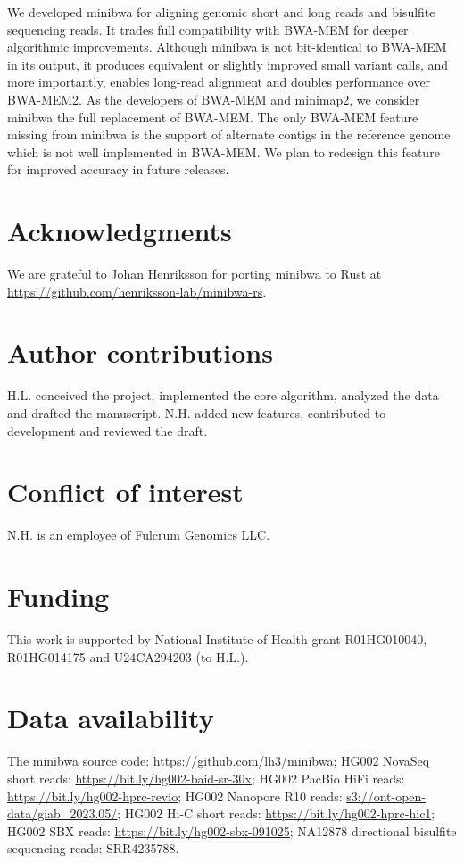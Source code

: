 \documentclass[webpdf,contemporary,large,namedate]{oup-authoring-template}%
\begin{document}
We developed minibwa for aligning genomic short and long reads and bisulfite sequencing reads.
It trades full compatibility with BWA-MEM for deeper algorithmic improvements.
Although minibwa is not bit-identical to BWA-MEM in its output,
it produces equivalent or slightly improved small variant calls,
and more importantly, enables long-read alignment and doubles performance over BWA-MEM2.
As the developers of BWA-MEM and minimap2, we consider minibwa the full replacement of BWA-MEM.
The only BWA-MEM feature missing from minibwa is the support of alternate contigs in the reference genome
which is not well implemented in BWA-MEM.
We plan to redesign this feature for improved accuracy in future releases.

\section*{Acknowledgments}

We are grateful to Johan Henriksson for porting minibwa to Rust at \url{https://github.com/henriksson-lab/minibwa-rs}.

\section*{Author contributions}

H.L. conceived the project, implemented the core algorithm, analyzed the data and drafted the manuscript.
N.H. added new features, contributed to development and reviewed the draft.

\section*{Conflict of interest}

N.H. is an employee of Fulcrum Genomics LLC.

\section*{Funding}

This work is supported by National Institute of Health grant R01HG010040, R01HG014175 and U24CA294203 (to H.L.).

\section*{Data availability}

The minibwa source code: \url{https://github.com/lh3/minibwa};
HG002 NovaSeq short reads: \url{https://bit.ly/hg002-baid-sr-30x};
HG002 PacBio HiFi reads: \url{https://bit.ly/hg002-hprc-revio};
HG002 Nanopore R10 reads: \url{s3://ont-open-data/giab\_2023.05/};
HG002 Hi-C short reads: \url{https://bit.ly/hg002-hprc-hic1};
HG002 SBX reads: \url{https://bit.ly/hg002-sbx-091025};
NA12878 directional bisulfite sequencing reads: SRR4235788.


{\sffamily\small
}
\end{document}
